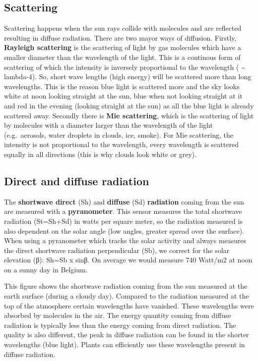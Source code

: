 \documentclass[oneside]{book}
\begin{document}
\subsection{Scattering}\label{scattering}

Scattering happens when the sun rays collide with molecules and are
reflected resulting in diffuse radiation. There are two mayor ways of
diffusion. Firstly, \textbf{Rayleigh scattering} is the scattering of
light by gas molecules which have a smaller diameter than the wavelength
of the light. This is a continous form of scattering of which the
intensity is inversely proportional to the wavelength (
\textasciitilde{} lambda-4). So, short wave lengths (high energy) will
be scattered more than long wavelengths. This is the reason blue light
is scattered more and the sky looks white at noon looking straight at
the sun, blue when not looking straight at it and red in the evening
(looking straight at the sun) as all the blue light is already scattered
away. Secondly there is \textbf{Mie scattering}, which is the scattering
of light by molecules with a diameter larger than the wavelength of the
light (e.g.~aerosols, water droplets in clouds, ice, smoke). For Mie
scattering, the intensity is not proportional to the wavelength, every
wavelength is scattered equally in all directions (this is why clouds
look white or grey).

\subsection{Direct and diffuse
radiation}\label{direct-and-diffuse-radiation}

The \textbf{shortwave direct} (Sh) and \textbf{diffuse} (Sd)
\textbf{radiation} coming from the sun are measured with a
\textbf{pyranometer}. This sensor measures the total shortwave radiation
(St=Sh+Sd) in watts per square meter, so the radiation measured is also
dependent on the solar angle (low angles, greater spread over the
surface). When using a pyranometer which tracks the solar activity and
always measures the direct shortwave radiation perpendicular (Sb), we
correct for the solar elevation (β): Sh=Sb x sinβ. On average we would
measure 740 Watt/m2 at noon on a sunny day in Belgium.

This figure shows the shortwave radiation coming from the sun measured
at the earth surface (during a cloudy day). Compared to the radiation
measured at the top of the atmosphere certain wavelengths have vanished.
These wavelengths were absorbed by molecules in the air. The energy
quantity coming from diffuse radiation is typically less than the energy
coming from direct radiation. The quality is also different, the peak in
diffuse radiation can be found in the shorter wavelengths (blue light).
Plants can efficiently use these wavelengths present in diffuse
radiation.
\end{document}
